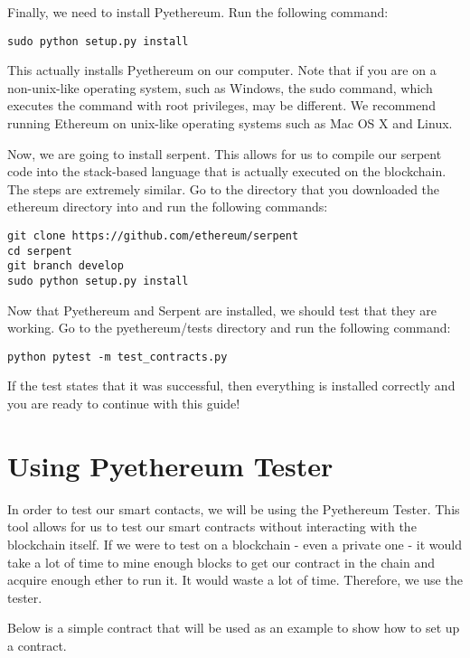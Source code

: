\documentclass[12pt]{article}
\begin{document}
Finally, we need to install Pyethereum. Run the following command:

\begin{lstlisting}
sudo python setup.py install
\end{lstlisting}

This actually installs Pyethereum on our computer. Note that if you are on a non-unix-like operating system, such as Windows, the sudo command, which executes the command with root privileges, may be different. We recommend running Ethereum on unix-like operating systems such as Mac OS X and Linux.

Now, we are going to install serpent. This allows for us to compile our serpent code into the stack-based language that is actually executed on the blockchain. The steps are extremely similar. Go to the directory that you downloaded the ethereum directory into and run the following commands:

\begin{lstlisting}
git clone https://github.com/ethereum/serpent
cd serpent
git branch develop
sudo python setup.py install
\end{lstlisting}

Now that Pyethereum and Serpent are installed, we should test that they are working. Go to the pyethereum/tests directory and run the following command:

\begin{lstlisting}
python pytest -m test_contracts.py
\end{lstlisting}

If the test states that it was successful, then everything is installed correctly and you are ready to continue with this guide!

\section{Using Pyethereum Tester}

In order to test our smart contacts, we will be using the Pyethereum Tester. This tool allows for us to test our smart contracts without interacting with the blockchain itself. If we were to test on a blockchain - even a private one - it would take a lot of time to mine enough blocks to get our contract in the chain and acquire enough ether to run it. It would waste a lot of time. Therefore, we use the tester.

Below is a simple contract that will be used as an example to show how to set up a contract.
\end{document}
